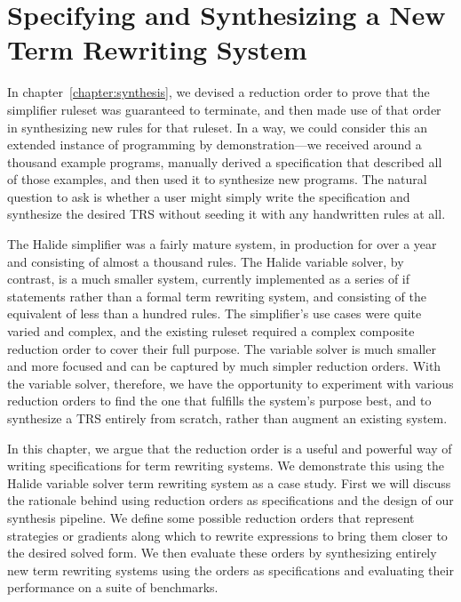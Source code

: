 \chapter{Specifying and Synthesizing a New Term Rewriting System}
\label{chapter:synthfromscratch}

In chapter~\ref{chapter:synthesis}, we devised a reduction order to prove that the simplifier ruleset was guaranteed to terminate, and then made use of that order in synthesizing new rules for that ruleset. In a way, we could consider this an extended instance of programming by demonstration---we received around a thousand example programs, manually derived a specification that described all of those examples, and then used it to synthesize new programs. The natural question to ask is whether a user might simply write the specification and synthesize the desired TRS without seeding it with any handwritten rules at all.

The Halide simplifier was a fairly mature system, in production for over a year and consisting of almost a thousand rules. The Halide variable solver, by contrast, is a much smaller system, currently implemented as a series of if statements rather than a formal term rewriting system, and consisting of the equivalent of less than a hundred rules. The simplifier's use cases were quite varied and complex, and the existing ruleset required a complex composite reduction order to cover their full purpose. The variable solver is much smaller and more focused and can be captured by much simpler reduction orders. With the variable solver, therefore, we have the opportunity to experiment with various reduction orders to find the one that fulfills the system's purpose best, and to synthesize a TRS entirely from scratch, rather than augment an existing system.

In this chapter, we argue that the reduction order is a useful and powerful way of writing specifications for term rewriting systems. We demonstrate this using the Halide variable solver term rewriting system as a case study. First we will discuss the rationale behind using reduction orders as specifications and the design of our synthesis pipeline. We define some possible reduction orders that represent strategies or gradients along which to rewrite expressions to bring them closer to the desired solved form. We then evaluate these orders by synthesizing entirely new term rewriting systems using the orders as specifications and evaluating their performance on a suite of benchmarks.

